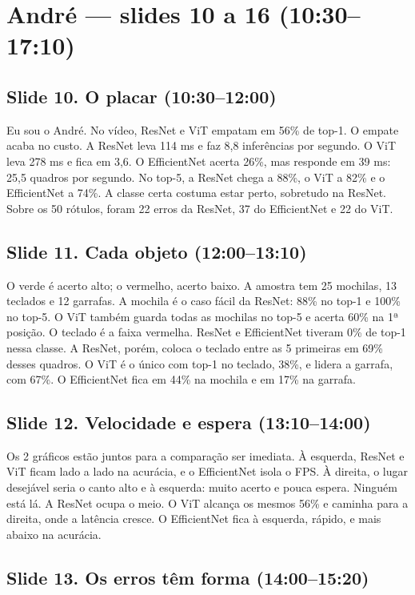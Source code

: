 \documentclass[12pt,a4paper]{article}
\begin{document}
\section*{André --- slides 10 a 16 (10:30--17:10)}

\subsection*{Slide 10. O placar (10:30--12:00)}

Eu sou o André. No vídeo, ResNet e ViT empatam em 56\% de top-1. O empate acaba no custo. A ResNet
leva 114 ms e faz 8,8 inferências por segundo. O ViT leva 278 ms e fica em 3,6. O EfficientNet
acerta 26\%, mas responde em 39 ms: 25,5 quadros por segundo. No top-5, a ResNet chega a 88\%,
o ViT a 82\% e o EfficientNet a 74\%. A classe certa costuma estar perto, sobretudo na ResNet.
Sobre os 50 rótulos, foram 22 erros da ResNet, 37 do EfficientNet e 22 do ViT.

\subsection*{Slide 11. Cada objeto (12:00--13:10)}

O verde é acerto alto; o vermelho, acerto baixo. A amostra tem 25 mochilas, 13 teclados e 12
garrafas. A mochila é o caso fácil da ResNet: 88\% no top-1 e 100\% no top-5. O ViT também guarda
todas as mochilas no top-5 e acerta 60\% na 1ª posição. O teclado é a faixa vermelha. ResNet e
EfficientNet tiveram 0\% de top-1 nessa classe. A ResNet, porém, coloca o teclado entre as 5
primeiras em 69\% desses quadros. O ViT é o único com top-1 no teclado, 38\%, e lidera a garrafa,
com 67\%. O EfficientNet fica em 44\% na mochila e em 17\% na garrafa.

\subsection*{Slide 12. Velocidade e espera (13:10--14:00)}

Os 2 gráficos estão juntos para a comparação ser imediata. À esquerda, ResNet e ViT ficam lado a
lado na acurácia, e o EfficientNet isola o FPS. À direita, o lugar desejável seria o canto alto e
à esquerda: muito acerto e pouca espera. Ninguém está lá. A ResNet ocupa o meio. O ViT alcança os
mesmos 56\% e caminha para a direita, onde a latência cresce. O EfficientNet fica à esquerda,
rápido, e mais abaixo na acurácia.

\subsection*{Slide 13. Os erros têm forma (14:00--15:20)}
\end{document}
